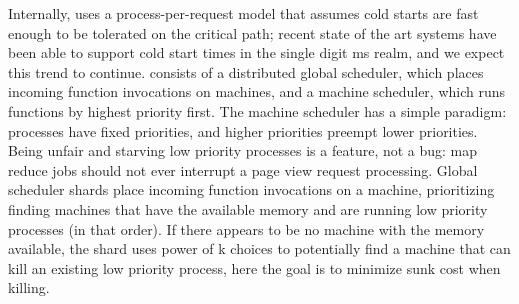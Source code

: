Internally, \sys{} uses a process-per-request model that assumes cold starts are
fast enough to be tolerated on the critical path; recent state of the art
systems have been able to support cold start times in the single digit ms realm,
and we expect this trend to continue.  \sys{} consists of a distributed global
scheduler, which places incoming function invocations on machines, and a machine
scheduler, which runs functions by highest priority first. The machine scheduler
has a simple paradigm: processes have fixed priorities, and higher priorities
preempt lower priorities. Being unfair and starving low priority processes is a
feature, not a bug: map reduce jobs should not ever interrupt a page view
request processing.  Global scheduler shards place incoming function invocations on a
machine, prioritizing finding machines that have the available memory and are
running low priority processes (in that order). If there appears to be no
machine with the memory available, the shard uses power of k choices to
potentially find a machine that can kill an existing low priority process, here
the goal is to minimize sunk cost when killing.

